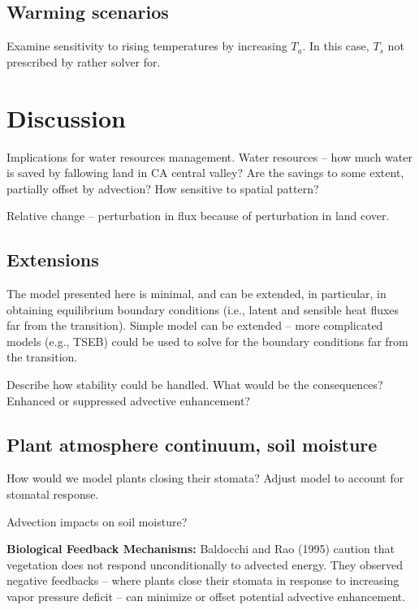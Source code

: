 \documentclass{article}
\begin{document}
    
    \subsection{Warming scenarios}
    
    Examine sensitivity to rising temperatures by increasing $T_a$.
    In this case, $T_s$ not prescribed by rather solver for.
    
    \section{Discussion}
    \label{sec:discussion}
    
    Implications for water resources management. 
    Water resources – how much water is saved by fallowing land in CA central valley? Are the savings to some extent, partially offset by advection? How sensitive to spatial pattern? 
    
    Relative change -- perturbation in flux because of perturbation in land cover. 
    
    \subsection{Extensions}
    
    The model presented here is minimal, and can be extended, in particular, in obtaining equilibrium boundary conditions (i.e., latent and sensible heat fluxes far from the transition).
    Simple model can be extended -- more complicated models (e.g., TSEB) could be used to solve for the boundary conditions far from the transition.
    
    Describe how stability could be handled. What would be the consequences? Enhanced or suppressed advective enhancement?
    
    \subsection{Plant atmosphere continuum, soil moisture}
    
    How would we model plants closing their stomata?
    Adjust model to account for stomatal response. 
    
    Advection impacts on soil moisture? 
    
    \textbf{Biological Feedback Mechanisms:} Baldocchi and Rao (1995)
    caution that vegetation does not respond unconditionally to advected energy. 
    They observed negative feedbacks -- where plants close their stomata in response to increasing vapor pressure deficit -- can minimize or offset potential advective enhancement. 
    
\end{document}
